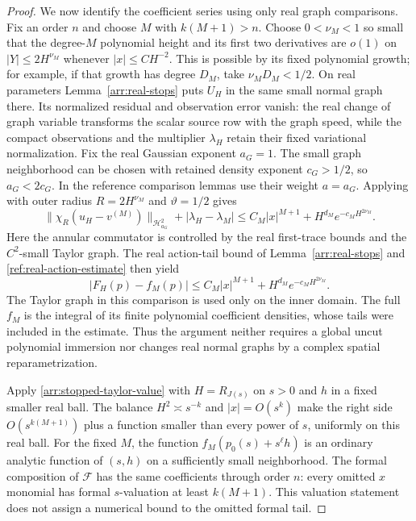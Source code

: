 \begin{proof}
We now identify the coefficient series using only real graph
comparisons.  Fix an order $n$ and choose $M$ with $k(M+1)>n$.
Choose $0<\nu_M<1$ so small that the degree-$M$ polynomial height and
its first two derivatives are $o(1)$ on $|Y|\le2H^{\nu_M}$ whenever
$|x|\le CH^{-2}$.  This is possible by its fixed polynomial growth;
for example, if that growth has degree $D_M$, take
$\nu_MD_M<1/2$.  On real parameters Lemma~\ref{arr:real-stops} puts
$U_H$ in the same small normal graph there.  Its normalized residual
and observation error vanish: the real change of graph variable
transforms the scalar source row with the graph speed, while the compact
observations and the multiplier $\lambda_H$ retain their fixed
variational normalization.  Fix the real Gaussian exponent $a_G=1$.
The small graph neighborhood can be chosen with retained density exponent
$c_G>1/2$, so $a_G<2c_G$.  In the reference comparison lemmas use their
weight $a=a_G$.  Applying
 with outer radius
$R=2H^{\nu_M}$ and $\vartheta=1/2$ gives
\[
 \|\chi_R(u_H-v^{(M)})\|_{\mathcal H^2_{a_G}}
       +|\lambda_H-\lambda_M|
 \le C_M|x|^{M+1}+H^{d_M}e^{-c_MH^{2\nu_M}}.
\]
Here the annular commutator is controlled by the real first-trace
bounds and the $C^2$-small Taylor graph.  The real action-tail bound
of Lemma~\ref{arr:real-stops} and \eqref{ref:real-action-estimate}
then yield
\begin{equation}\label{arr:stopped-taylor-value}
 |F_H(p)-f_M(p)|
 \le C_M|x|^{M+1}+H^{d_M}e^{-c_MH^{2\nu_M}}.
\end{equation}
The Taylor graph in this comparison is used only on the inner domain.
The full $f_M$ is the integral of its finite polynomial coefficient
densities, whose tails were included in the estimate.  Thus the argument
neither requires a global uncut polynomial immersion nor changes real
normal graphs by a complex spatial reparametrization.

Apply \eqref{arr:stopped-taylor-value} with $H=R_{J(s)}$ on $s>0$ and
$h$ in a fixed smaller real ball.  The balance $H^2\asymp s^{-k}$
and $|x|=O(s^k)$ make the right side
$O(s^{k(M+1)})$ plus a function smaller than every power of $s$,
uniformly on this real ball.  For the fixed $M$, the function
$f_M(p_0(s)+s^\ell h)$ is an ordinary analytic function of $(s,h)$
on a sufficiently small neighborhood.  The formal composition of
$\mathcal F$ has the same coefficients through order $n$: every
omitted $x$ monomial has formal $s$-valuation at least $k(M+1)$.
This valuation statement does not assign a numerical bound to the
omitted formal tail.


\end{proof}
